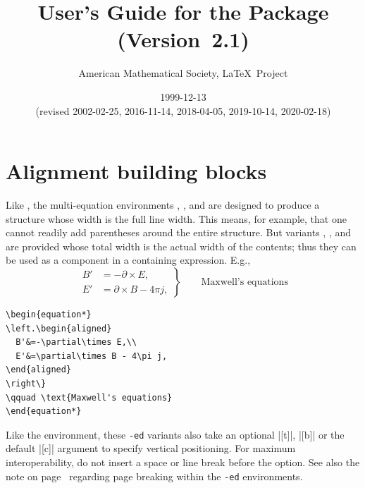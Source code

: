 \documentclass[leqno,titlepage,openany]{amsldoc}[1999/12/13]
\title{User's Guide for the \nipkg{amsmath} Package (Version~2.1)}
\author{American Mathematical Society, \LaTeX\ Project}
\date{1999-12-13\\(revised 2002-02-25, 2016-11-14, 2018-04-05, 2019-10-14, 2020-02-18)}
\begin{document}
\section{Alignment building blocks}

Like , the multi-equation environments ,
, and  are designed to produce a structure
whose width is the full line width. This means, for example, that one
cannot readily add parentheses around the entire structure. But
variants
, , and  are provided whose
total width is the actual width of the contents; thus they can be used
as a component in a containing expression. E.g.,
\begin{equation*}
\left.\begin{aligned}
  B'&=-\partial\times E,\\
  E'&=\partial\times B - 4\pi j,
\end{aligned}
\right\}
\qquad \text{Maxwell's equations}
\end{equation*}
\begin{verbatim}
\begin{equation*}
\left.\begin{aligned}
  B'&=-\partial\times E,\\
  E'&=\partial\times B - 4\pi j,
\end{aligned}
\right\}
\qquad \text{Maxwell's equations}
\end{equation*}
\end{verbatim}
Like the  environment, these \texttt{-ed} variants also take
an optional
|[t]|,
|[b]| or the default
|[c]|
argument to specify vertical
positioning.  For maximum interoperability, do not insert a
space\index{options!space before \texttt{[}}
or line break before the option.  See
also the note on page~\pageref{breaknote} regarding page breaking
within the \texttt{-ed} environments.
\end{document}
